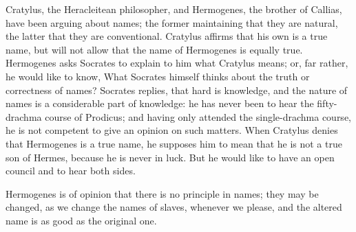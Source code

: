 \documentclass[11pt,letter]{article}
\begin{document}
\par  Cratylus, the Heracleitean philosopher, and Hermogenes, the brother of Callias, have been arguing about names; the former maintaining that they are natural, the latter that they are conventional. Cratylus affirms that his own is a true name, but will not allow that the name of Hermogenes is equally true. Hermogenes asks Socrates to explain to him what Cratylus means; or, far rather, he would like to know, What Socrates himself thinks about the truth or correctness of names? Socrates replies, that hard is knowledge, and the nature of names is a considerable part of knowledge: he has never been to hear the fifty-drachma course of Prodicus; and having only attended the single-drachma course, he is not competent to give an opinion on such matters. When Cratylus denies that Hermogenes is a true name, he supposes him to mean that he is not a true son of Hermes, because he is never in luck. But he would like to have an open council and to hear both sides.

\par  Hermogenes is of opinion that there is no principle in names; they may be changed, as we change the names of slaves, whenever we please, and the altered name is as good as the original one.
\end{document}
